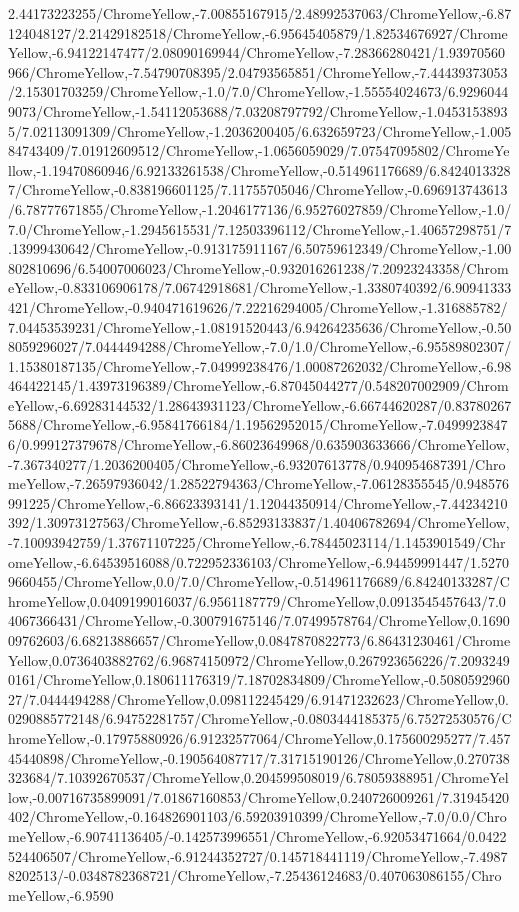 {\begin{tikzternal}
2.44173223255/ChromeYellow,-7.00855167915/2.48992537063/ChromeYellow,-6.87124048127/2.21429182518/ChromeYellow,-6.95645405879/1.82534676927/ChromeYellow,-6.94122147477/2.08090169944/ChromeYellow,-7.28366280421/1.93970560966/ChromeYellow,-7.54790708395/2.04793565851/ChromeYellow,-7.44439373053/2.15301703259/ChromeYellow,-1.0/7.0/ChromeYellow,-1.55554024673/6.92960449073/ChromeYellow,-1.54112053688/7.03208797792/ChromeYellow,-1.04531538935/7.02113091309/ChromeYellow,-1.2036200405/6.632659723/ChromeYellow,-1.00584743409/7.01912609512/ChromeYellow,-1.0656059029/7.07547095802/ChromeYellow,-1.19470860946/6.92133261538/ChromeYellow,-0.514961176689/6.84240133287/ChromeYellow,-0.838196601125/7.11755705046/ChromeYellow,-0.696913743613/6.78777671855/ChromeYellow,-1.2046177136/6.95276027859/ChromeYellow,-1.0/7.0/ChromeYellow,-1.2945615531/7.12503396112/ChromeYellow,-1.40657298751/7.13999430642/ChromeYellow,-0.913175911167/6.50759612349/ChromeYellow,-1.00802810696/6.54007006023/ChromeYellow,-0.932016261238/7.20923243358/ChromeYellow,-0.833106906178/7.06742918681/ChromeYellow,-1.3380740392/6.90941333421/ChromeYellow,-0.940471619626/7.22216294005/ChromeYellow,-1.316885782/7.04453539231/ChromeYellow,-1.08191520443/6.94264235636/ChromeYellow,-0.508059296027/7.0444494288/ChromeYellow,-7.0/1.0/ChromeYellow,-6.95589802307/1.15380187135/ChromeYellow,-7.04999238476/1.00087262032/ChromeYellow,-6.98464422145/1.43973196389/ChromeYellow,-6.87045044277/0.548207002909/ChromeYellow,-6.69283144532/1.28643931123/ChromeYellow,-6.66744620287/0.837802675688/ChromeYellow,-6.95841766184/1.19562952015/ChromeYellow,-7.04999238476/0.999127379678/ChromeYellow,-6.86023649968/0.635903633666/ChromeYellow,-7.367340277/1.2036200405/ChromeYellow,-6.93207613778/0.940954687391/ChromeYellow,-7.26597936042/1.28522794363/ChromeYellow,-7.06128355545/0.948576991225/ChromeYellow,-6.86623393141/1.12044350914/ChromeYellow,-7.44234210392/1.30973127563/ChromeYellow,-6.85293133837/1.40406782694/ChromeYellow,-7.10093942759/1.37671107225/ChromeYellow,-6.78445023114/1.1453901549/ChromeYellow,-6.64539516088/0.722952336103/ChromeYellow,-6.94459991447/1.52709660455/ChromeYellow,0.0/7.0/ChromeYellow,-0.514961176689/6.84240133287/ChromeYellow,0.0409199016037/6.9561187779/ChromeYellow,0.0913545457643/7.04067366431/ChromeYellow,-0.300791675146/7.07499578764/ChromeYellow,0.169009762603/6.68213886657/ChromeYellow,0.0847870822773/6.86431230461/ChromeYellow,0.0736403882762/6.96874150972/ChromeYellow,0.267923656226/7.20932490161/ChromeYellow,0.180611176319/7.18702834809/ChromeYellow,-0.508059296027/7.0444494288/ChromeYellow,0.098112245429/6.91471232623/ChromeYellow,0.0290885772148/6.94752281757/ChromeYellow,-0.0803444185375/6.75272530576/ChromeYellow,-0.17975880926/6.91232577064/ChromeYellow,0.175600295277/7.45745440898/ChromeYellow,-0.190564087717/7.31715190126/ChromeYellow,0.270738323684/7.10392670537/ChromeYellow,0.204599508019/6.78059388951/ChromeYellow,-0.00716735899091/7.01867160853/ChromeYellow,0.240726009261/7.31945420402/ChromeYellow,-0.164826901103/6.59203910399/ChromeYellow,-7.0/0.0/ChromeYellow,-6.90741136405/-0.142573996551/ChromeYellow,-6.92053471664/0.0422524406507/ChromeYellow,-6.91244352727/0.145718441119/ChromeYellow,-7.49878202513/-0.0348782368721/ChromeYellow,-7.25436124683/0.407063086155/ChromeYellow,-6.9590
\end{tikzternal}}
